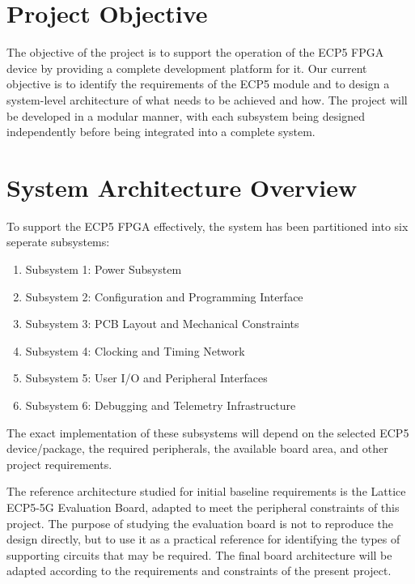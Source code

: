 \documentclass[12pt,a4paper]{article}
\begin{document}
\newpage
{}

\section{Project Objective}

The objective of the project is to support the operation of the ECP5 FPGA device by providing a complete development platform for it. Our current objective is to identify the requirements of the ECP5 module and to design a system-level architecture of what needs to be achieved and how. The project will be developed in a modular manner, with each subsystem being designed independently before being integrated into a complete system.

\section{System Architecture Overview}

To support the ECP5 FPGA effectively, the system has been partitioned into six seperate subsystems:
\begin{enumerate}[leftmargin=1.5cm]
    \item Subsystem 1: Power Subsystem
    \item Subsystem 2: Configuration and Programming Interface
    \item Subsystem 3: PCB Layout and Mechanical Constraints
    \item Subsystem 4: Clocking and Timing Network
    \item Subsystem 5: User I/O and Peripheral Interfaces
    \item Subsystem 6: Debugging and Telemetry Infrastructure
\end{enumerate}

The exact implementation of these subsystems will depend on the selected ECP5 device/package, the required peripherals, the available board area, and other project requirements.

The reference architecture studied for initial baseline requirements is the Lattice ECP5-5G Evaluation Board, adapted to meet the peripheral constraints of this project. The purpose of studying the evaluation board is not to reproduce the design directly, but to use it as a practical reference for identifying the types of supporting circuits that may be required. The final board architecture will be adapted according to the requirements and constraints of the present project.
\end{document}
